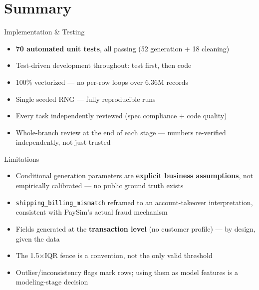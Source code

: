 \documentclass[aspectratio=169]{beamer}
\begin{document}
\section{Summary}

\begin{frame}{Implementation \& Testing}
\begin{itemize}
    \item \textbf{70 automated unit tests}, all passing (52 generation + 18 cleaning)
    \item Test-driven development throughout: test first, then code
    \item 100\% vectorized --- no per-row loops over 6.36M records
    \item Single seeded RNG --- fully reproducible runs
    \item Every task independently reviewed (spec compliance + code quality)
    \item Whole-branch review at the end of each stage --- numbers re-verified independently, not just trusted
\end{itemize}
\end{frame}

\begin{frame}{Limitations}
\begin{itemize}
    \item Conditional generation parameters are \textbf{explicit business assumptions}, not empirically calibrated --- no public ground truth exists
    \item \texttt{shipping\_billing\_mismatch} reframed to an account-takeover interpretation, consistent with PaySim's actual fraud mechanism
    \item Fields generated at the \textbf{transaction level} (no customer profile) --- by design, given the data
    \item The 1.5\(\times\)IQR fence is a convention, not the only valid threshold
    \item Outlier/inconsistency flags mark rows; using them as model features is a modeling-stage decision
\end{itemize}
\end{frame}
\end{document}
